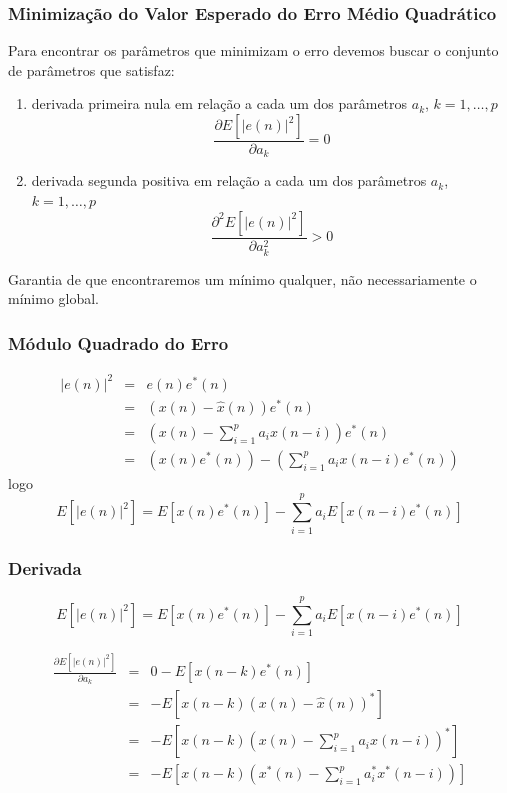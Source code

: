 \begin{frame}%
  \frametitle{Minimização do Valor Esperado do Erro Médio Quadrático}
  Para encontrar os parâmetros que minimizam o erro devemos buscar o conjunto de parâmetros que satisfaz:
  \begin{enumerate}
  \item derivada primeira nula em relação a cada um dos parâmetros $a_k$, $k=1,\ldots,p$
  \begin{equation}
  \frac{\partial E\left[ \vert e(n) \vert^2 \right]}{\partial a_k} = 0
  \end{equation}
  \item derivada segunda positiva em relação a cada um dos parâmetros $a_k$, $k=1,\ldots,p$
  \begin{equation}
  \frac{\partial^2 E\left[ \vert e(n) \vert^2 \right]}{\partial a_k^2} > 0
  \end{equation}
  \end{enumerate}
  Garantia de que encontraremos um mínimo qualquer, não necessariamente o mínimo global.
\end{frame} 


\begin{frame}%
  \frametitle{Módulo Quadrado do Erro}
  \begin{eqnarray}
  \vert e(n) \vert^2 &=& e(n) e^\ast(n) \nonumber \\
        &=& (x(n) - \hat{x}(n)) e^\ast(n) \nonumber \\
        &=& \left( x(n) - \sum_{i=1}^p a_i x(n-i) \right) e^\ast(n) \nonumber \\
        &=& \left( x(n) e^\ast(n) \right) - \left( \sum_{i=1}^p a_i x(n-i) e^\ast(n) \right) 
  \end{eqnarray}
  logo
  \begin{equation}
  E\left[ \vert e(n) \vert^2 \right] = E\left[ x(n) e^\ast(n) \right] - \sum_{i=1}^p a_i E\left[ x(n-i) e^\ast(n) \right]
  \end{equation}
\end{frame} 


\begin{frame}%
  \frametitle{Derivada}
  \begin{equation}
  E\left[ \vert e(n) \vert^2 \right] = E\left[ x(n) e^\ast(n) \right] - \sum_{i=1}^p a_i E\left[ x(n-i) e^\ast(n) \right] \nonumber
  \end{equation}

  \begin{eqnarray}
  \frac{\partial E\left[ \vert e(n) \vert^2 \right]}{\partial a_k} &=& 0 - E\left[ x(n-k) e^\ast(n) \right] \nonumber \\
       &=& - E\left[ x(n-k) \left( x(n) - \hat{x}(n) \right)^\ast \right] \nonumber \\
       &=& - E\left[ x(n-k) \left( x(n) - \sum_{i=1}^p a_i x(n-i) \right)^\ast \right] \nonumber \\
       &=& - E\left[ x(n-k) \left( x^\ast(n) - \sum_{i=1}^p a_i^\ast x^\ast(n-i) \right) \right] \nonumber
  \end{eqnarray}
\end{frame} 


